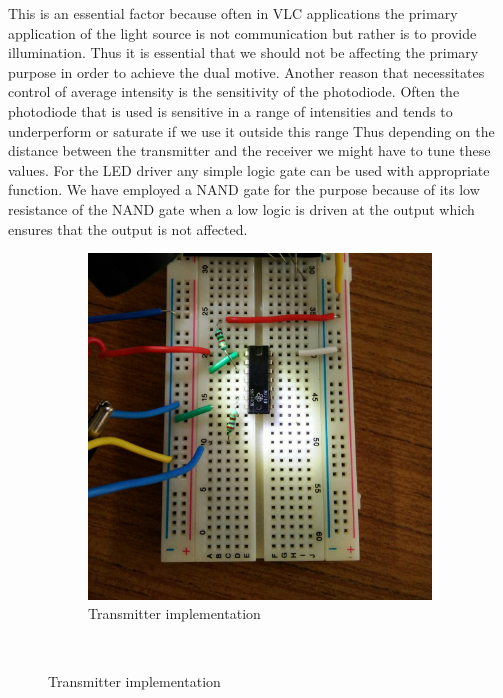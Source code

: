 \documentclass{article}
\begin{document}
This is an essential factor because often in VLC applications the primary application of the light source is not communication but rather is to provide illumination. Thus it is essential that we should not be affecting the primary purpose in order to achieve the dual motive. Another reason that necessitates control of average intensity is the sensitivity of the photodiode. Often the photodiode that is used is sensitive in a range of intensities and tends to underperform or saturate if we use it outside this range Thus depending on the distance between the transmitter and the receiver we might have to tune these values. For the LED driver any simple logic gate can be used with appropriate function. We have employed a NAND gate for the purpose because of its low resistance of the NAND gate when a low logic is driven at the output which ensures that the output is not affected.

\begin{figure}[h]
\begin{subfigure}[t]{0.5\textwidth}
	\centering
	\includegraphics[scale = 0.4]{images/Transmitter.JPG}
	\caption{Transmitter implementation}
	\label{Fig :1b}
\end{subfigure}
~

\end{figure}
\end{document}
